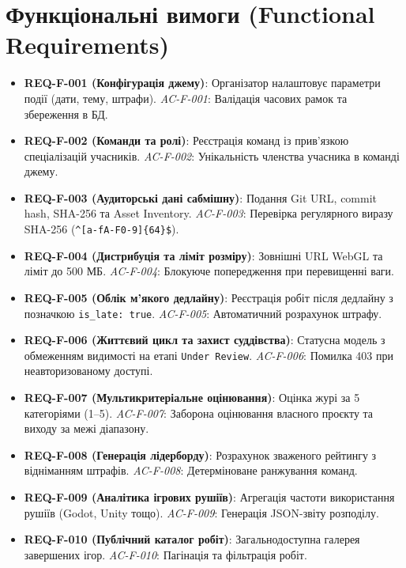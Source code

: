 \documentclass[12pt,a4paper]{article}
\begin{document}
\section{Функціональні вимоги (Functional Requirements)}
\begin{itemize}
    \item \textbf{REQ-F-001 (Конфігурація джему)}: Організатор налаштовує параметри події (дати, тему, штрафи). \textit{AC-F-001}: Валідація часових рамок та збереження в БД.
    \item \textbf{REQ-F-002 (Команди та ролі)}: Реєстрація команд із прив'язкою спеціалізацій учасників. \textit{AC-F-002}: Унікальність членства учасника в команді джему.
    \item \textbf{REQ-F-003 (Аудиторські дані сабмішну)}: Подання Git URL, commit hash, SHA-256 та Asset Inventory. \textit{AC-F-003}: Перевірка регулярного виразу SHA-256 (\texttt{\^{}[a-fA-F0-9]\{64\}\$}).
    \item \textbf{REQ-F-004 (Дистрибуція та ліміт розміру)}: Зовнішні URL WebGL та ліміт до 500 МБ. \textit{AC-F-004}: Блокуюче попередження при перевищенні ваги.
    \item \textbf{REQ-F-005 (Облік м'якого дедлайну)}: Реєстрація робіт після дедлайну з позначкою \texttt{is\_late: true}. \textit{AC-F-005}: Автоматичний розрахунок штрафу.
    \item \textbf{REQ-F-006 (Життєвий цикл та захист суддівства)}: Статусна модель з обмеженням видимості на етапі \texttt{Under Review}. \textit{AC-F-006}: Помилка 403 при неавторизованому доступі.
    \item \textbf{REQ-F-007 (Мультикритеріальне оцінювання)}: Оцінка журі за 5 категоріями (1--5). \textit{AC-F-007}: Заборона оцінювання власного проєкту та виходу за межі діапазону.
    \item \textbf{REQ-F-008 (Генерація лідерборду)}: Розрахунок зваженого рейтингу з відніманням штрафів. \textit{AC-F-008}: Детерміноване ранжування команд.
    \item \textbf{REQ-F-009 (Аналітика ігрових рушіїв)}: Агрегація частоти використання рушіїв (Godot, Unity тощо). \textit{AC-F-009}: Генерація JSON-звіту розподілу.
    \item \textbf{REQ-F-010 (Публічний каталог робіт)}: Загальнодоступна галерея завершених ігор. \textit{AC-F-010}: Пагінація та фільтрація робіт.
\end{itemize}
\end{document}
